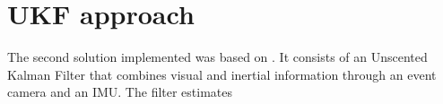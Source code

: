\section{UKF approach}
\label{sec3:sec_ukf_approach}

The second solution implemented was based on \cite{brossard2017unscented}. It consists of an Unscented Kalman Filter that combines visual and inertial information through an event camera and an IMU. The filter estimates 
